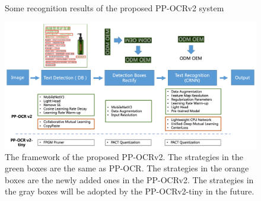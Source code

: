 \documentclass[letterpaper]{article} %
\begin{document}
\begin{figure}[t]
\centering
{}


\caption{Some recognition results of the proposed PP-OCRv2 system}
\label{res_p1}
\end{figure}

\begin{figure}[t]
\centering
\includegraphics[width=15cm]{framework_pp_ocr_v2.jpg}
\caption{The framework of the proposed PP-OCRv2. The strategies in the green boxes are the same as PP-OCR. The strategies in the orange boxes are the newly added ones in the PP-OCRv2. The strategies in the gray boxes will be adopted by the PP-OCRv2-tiny in the future.}
\label{framework}
\end{figure}
\end{document}
